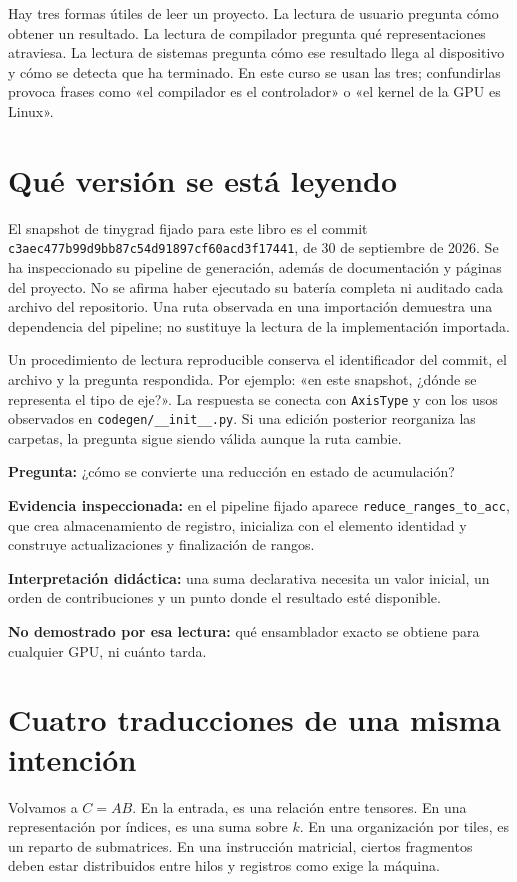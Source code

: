 \documentclass[12pt,a4paper,oneside]{report}
\begin{document}
Hay tres formas útiles de leer un proyecto. La lectura de usuario pregunta cómo obtener un resultado. La lectura de compilador pregunta qué representaciones atraviesa. La lectura de sistemas pregunta cómo ese resultado llega al dispositivo y cómo se detecta que ha terminado. En este curso se usan las tres; confundirlas provoca frases como «el compilador es el controlador» o «el kernel de la GPU es Linux».

\section{Qué versión se está leyendo}
El snapshot de tinygrad fijado para este libro es el commit \texttt{c3aec477b99d\allowbreak{}9bb87c54d918\allowbreak{}97cf60acd3f1\allowbreak{}7441}, de 30 de septiembre de 2026. Se ha inspeccionado su pipeline de generación, además de documentación y páginas del proyecto. No se afirma haber ejecutado su batería completa ni auditado cada archivo del repositorio. Una ruta observada en una importación demuestra una dependencia del pipeline; no sustituye la lectura de la implementación importada. \cite{tinygrad-pin,tinygrad-codegen}

Un procedimiento de lectura reproducible conserva el identificador del commit, el archivo y la pregunta respondida. Por ejemplo: «en este snapshot, ¿dónde se representa el tipo de eje?». La respuesta se conecta con \texttt{AxisType} y con los usos observados en \texttt{codegen/\_\_init\_\_.py}. Si una edición posterior reorganiza las carpetas, la pregunta sigue siendo válida aunque la ruta cambie.

\begin{ejemplo}
\textbf{Pregunta:} ¿cómo se convierte una reducción en estado de acumulación?

\textbf{Evidencia inspeccionada:} en el pipeline fijado aparece \texttt{reduce\_ranges\_to\_acc}, que crea almacenamiento de registro, inicializa con el elemento identidad y construye actualizaciones y finalización de rangos.

\textbf{Interpretación didáctica:} una suma declarativa necesita un valor inicial, un orden de contribuciones y un punto donde el resultado esté disponible.

\textbf{No demostrado por esa lectura:} qué ensamblador exacto se obtiene para cualquier GPU, ni cuánto tarda.

\end{ejemplo}
\section{Cuatro traducciones de una misma intención}
Volvamos a $C=AB$. En la entrada, es una relación entre tensores. En una representación por índices, es una suma sobre $k$. En una organización por tiles, es un reparto de submatrices. En una instrucción matricial, ciertos fragmentos deben estar distribuidos entre hilos y registros como exige la máquina.
\end{document}
